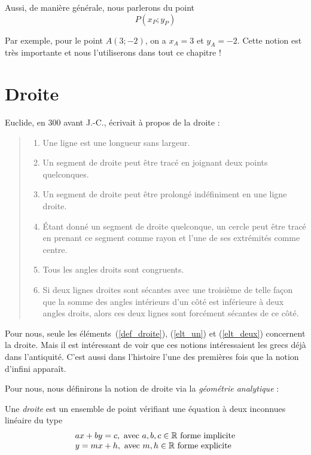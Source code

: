 Aussi, de manière générale, nous parlerons du point
$$
P(x_P;y_P)
$$

Par exemple, pour le point $A(3;-2)$, on a $x_A = 3$ et $y_A = -2$. Cette notion est très importante et nous l'utiliserons dans tout ce chapitre !

\section{Droite}

Euclide, en $300$ avant J.-C., écrivait à propos de la droite :
\begin{quote}
\begin{enumerate}
\item Une ligne est une longueur sans largeur.\label{def_droite}
\item  Un segment de droite peut être tracé en joignant deux points quelconques.\label{elt_un}
\item Un segment de droite peut être prolongé indéfiniment en une ligne droite.\label{elt_deux}
\item Étant donné un segment de droite quelconque, un cercle peut être tracé en prenant ce segment comme rayon et l'une de ses extrémités comme centre.\label{elt_trois}
\item Tous les angles droits sont congruents.\label{elt_quatre}
\item Si deux lignes droites sont sécantes avec une troisième de telle façon que la somme des angles intérieurs d'un côté est inférieure à deux angles droits, alors ces deux lignes sont forcément sécantes de ce côté.\label{elt_cinq}
\end{enumerate}
\end{quote}
Pour nous, seule les éléments~(\ref{def_droite}), (\ref{elt_un}) et (\ref{elt_deux}) concernent la droite. Mais il est intéressant de voir que ces notions intéressaient les grecs déjà dans l'antiquité. C'est aussi dans l'histoire l'une des premières fois que la notion d'infini appara\^it.

Pour nous, nous définirons la notion de droite via la \emph{géométrie analytique} :

\begin{definition}
Une \emph{droite} est un ensemble de point vérifiant une équation à deux inconnues linéaire du type
$$\begin{array}{l}
ax+by=c, \mbox{ avec } a,b,c\in \mathbb{R} \mbox{ forme implicite}\\
y = mx + h, \mbox{ avec } m,h\in \mathbb{R} \mbox{ forme explicite}
\end{array}
$$
\end{definition}

